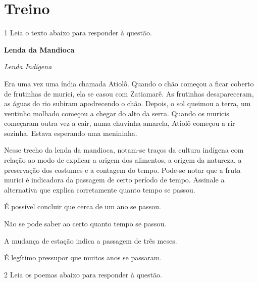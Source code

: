 \section{Treino}

\num{1} Leia o texto abaixo para responder à questão.

\begin{myquote}

\textbf{Lenda da Mandioca}

\emph{Lenda Indígena}

Era uma vez uma índia chamada Atiolô. Quando o chão começou a ficar
coberto de frutinhas de murici, ela se casou com Zatiamarê. As frutinhas
desapareceram, as águas do rio subiram apodrecendo o chão. Depois, o sol
queimou a terra, um ventinho molhado começou a chegar do alto da serra.
Quando os muricis começaram outra vez a cair, numa chuvinha amarela,
Atiolô começou a rir sozinha. Estava esperando uma menininha.

\end{myquote}


Nesse trecho da lenda da mandioca, notam-se traços da cultura
indígena com relação ao modo de explicar a origem dos alimentos, a
origem da natureza, a preservação dos costumes e a contagem do tempo.
Pode-se notar que a fruta murici é indicadora da passagem de certo 
período de tempo. Assinale a alternativa que explica corretamente 
quanto tempo se passou.

\begin{escolha}

  \item É possível concluir que cerca de um ano se passou.
  
  \item Não se pode saber ao certo quanto tempo se passou.
  
  \item A mudança de estação indica a passagem de três meses.  
  
  \item É legítimo pressupor que muitos anos se passaram. 

\end{escolha}

\num{2} Leia os poemas abaixo para responder à questão. 

